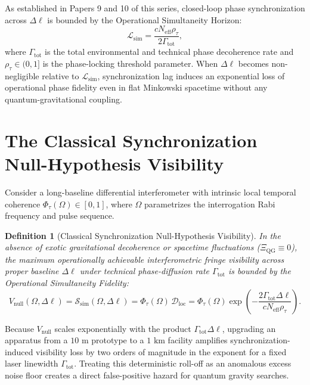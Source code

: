 \documentclass[11pt,a4paper]{article}
\newtheorem{definition}{Definition}
\begin{document}
As established in Papers 9 and 10 of this series, closed-loop phase synchronization across $\Delta\ell$ is bounded by the Operational Simultaneity Horizon:
\begin{equation}
\mathcal{L}_{\mathrm{sim}} = \frac{c N_{\mathrm{eff}} \rho_{\tau}}{2\Gamma_{\mathrm{tot}}},
\end{equation}
where $\Gamma_{\mathrm{tot}}$ is the total environmental and technical phase decoherence rate and $\rho_{\tau} \in (0, 1]$ is the phase-locking threshold parameter. When $\Delta\ell$ becomes non-negligible relative to $\mathcal{L}_{\mathrm{sim}}$, synchronization lag induces an exponential loss of operational phase fidelity even in flat Minkowski spacetime without any quantum-gravitational coupling.

\section{The Classical Synchronization Null-Hypothesis Visibility}

Consider a long-baseline differential interferometer with intrinsic local temporal coherence $\Phi_{\tau}(\Omega) \in [0, 1]$, where $\Omega$ parametrizes the interrogation Rabi frequency and pulse sequence.

\begin{definition}[Classical Synchronization Null-Hypothesis Visibility]
In the absence of exotic gravitational decoherence or spacetime fluctuations ($\Xi_{\mathrm{QG}} \equiv 0$), the maximum operationally achievable interferometric fringe visibility across proper baseline $\Delta\ell$ under technical phase-diffusion rate $\Gamma_{\mathrm{tot}}$ is bounded by the Operational Simultaneity Fidelity:
\begin{equation}
V_{\mathrm{null}}(\Omega, \Delta\ell) = \mathcal{S}_{\mathrm{sim}}(\Omega, \Delta\ell) = \Phi_{\tau}(\Omega)\,\mathcal{D}_{\mathrm{loc}} = \Phi_{\tau}(\Omega)\exp\!\left(-\frac{2\Gamma_{\mathrm{tot}}\Delta\ell}{c N_{\mathrm{eff}}\rho_{\tau}}\right).
\end{equation}
\end{definition}

Because $V_{\mathrm{null}}$ scales exponentially with the product $\Gamma_{\mathrm{tot}}\Delta\ell$, upgrading an apparatus from a $10\text{ m}$ prototype to a $1\text{ km}$ facility amplifies synchronization-induced visibility loss by two orders of magnitude in the exponent for a fixed laser linewidth $\Gamma_{\mathrm{tot}}$. Treating this deterministic roll-off as an anomalous excess noise floor creates a direct false-positive hazard for quantum gravity searches.
\end{document}
